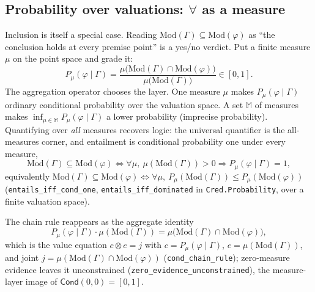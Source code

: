 \documentclass[11pt,a4paper]{article}
\newcommand{\Cond}{\mathsf{Cond}}
\newcommand{\conjc}{\otimes}
\newcommand{\Lean}[1]{\texttt{#1}}
\begin{document}
\subsection{Probability over valuations: $\forall$ as a measure}
\label{sec:measure-layer}

Inclusion is itself a special case.  Reading
$\mathrm{Mod}(\Gamma)\subseteq\mathrm{Mod}(\varphi)$ as ``the conclusion
holds at every premise point'' is a yes/no verdict.  Put a finite
measure $\mu$ on the point space and grade it:
\[
  P_\mu(\varphi\mid\Gamma)
  =\frac{\mu\bigl(\mathrm{Mod}(\Gamma)\cap\mathrm{Mod}(\varphi)\bigr)}
        {\mu\bigl(\mathrm{Mod}(\Gamma)\bigr)}\in[0,1].
\]
The aggregation operator chooses the layer.  One measure $\mu$ makes
$P_\mu(\varphi\mid\Gamma)$ ordinary conditional probability over the
valuation space.  A set $\mathbb{M}$ of measures makes
$\inf_{\mu\in\mathbb{M}}P_\mu(\varphi\mid\Gamma)$ a lower probability
(imprecise probability).  Quantifying over \emph{all} measures recovers
logic: the universal quantifier is the all-measures corner, and
entailment is conditional probability one under every measure,
\[
  \mathrm{Mod}(\Gamma)\subseteq\mathrm{Mod}(\varphi)
  \iff
  \forall\mu,\ \mu(\mathrm{Mod}(\Gamma))>0\Rightarrow
  P_\mu(\varphi\mid\Gamma)=1,
\]
equivalently $\mathrm{Mod}(\Gamma)\subseteq\mathrm{Mod}(\varphi)\iff
\forall\mu,\ P_\mu(\mathrm{Mod}(\Gamma))\le P_\mu(\mathrm{Mod}(\varphi))$
(\Lean{entails\_iff\_cond\_one}, \Lean{entails\_iff\_dominated} in
\texttt{Cred.Probability}, over a finite valuation space).

The chain rule reappears as the aggregate identity
\[
  P_\mu(\varphi\mid\Gamma)\cdot\mu(\mathrm{Mod}(\Gamma))
  =\mu\bigl(\mathrm{Mod}(\Gamma)\cap\mathrm{Mod}(\varphi)\bigr),
\]
which is the value equation $c\conjc e=j$ with $c=P_\mu(\varphi\mid\Gamma)$,
$e=\mu(\mathrm{Mod}(\Gamma))$, and joint
$j=\mu(\mathrm{Mod}(\Gamma)\cap\mathrm{Mod}(\varphi))$
(\Lean{cond\_chain\_rule}); zero-measure evidence leaves it unconstrained
(\Lean{zero\_evidence\_unconstrained}), the measure-layer image of
$\Cond(0,0)=[0,1]$.
\end{document}
